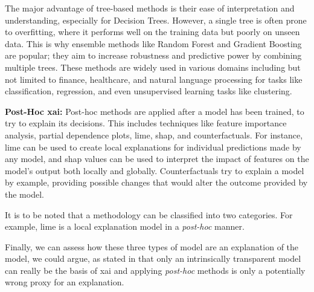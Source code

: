The major advantage of tree-based methods is their ease of interpretation and understanding, especially for Decision Trees. However, a single tree is often prone to overfitting, where it performs well on the training data but poorly on unseen data. This is why ensemble methods like Random Forest and Gradient Boosting are popular; they aim to increase robustness and predictive power by combining multiple trees. These methods are widely used in various domains including but not limited to finance, healthcare, and natural language processing for tasks like classification, regression, and even unsupervised learning tasks like clustering.

\textbf{Post-Hoc \ac{xai}:} Post-hoc methods are applied after a model has been trained, to try to explain its decisions. This includes techniques like feature importance analysis, partial dependence plots, \ac{lime}, \ac{shap}, and counterfactuals. For instance, \ac{lime} can be used to create local explanations for individual predictions made by any model, and \ac{shap} values can be used to interpret the impact of features on the model's output both locally and globally. Counterfactuals try to explain a model by example, providing possible changes that would alter the outcome provided by the model.

It is to be noted that a methodology can be classified into two categories. For example, \ac{lime} is a local explanation model in a \textit{post-hoc} manner.

Finally, we can assess how these three types of model are an explanation of the model, we could argue, as stated in \cite{rudinStopExplainingBlack2019} that only an intrinsically transparent model can really be the basis of \ac{xai} and applying \textit{post-hoc} methods is only a potentially wrong proxy for an explanation.

